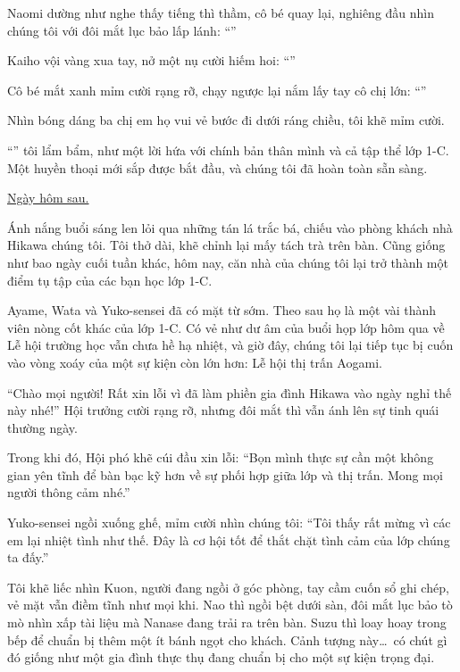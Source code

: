 \documentclass[../main.tex]{subfiles}
\begin{document}
Naomi dường như nghe thấy tiếng thì thầm, cô bé quay lại, nghiêng đầu nhìn chúng tôi với đôi mắt lục bảo lấp lánh: ``''

Kaiho vội vàng xua tay, nở một nụ cười hiếm hoi: ``''

Cô bé mắt xanh mỉm cười rạng rỡ, chạy ngược lại nắm lấy tay cô chị lớn: ``''

Nhìn bóng dáng ba chị em họ vui vẻ bước đi dưới ráng chiều, tôi khẽ mỉm cười.

``'' tôi lẩm bẩm, như một lời hứa với chính bản thân mình và cả tập thể lớp 1-C. Một huyền thoại mới sắp được bắt đầu, và chúng tôi đã hoàn toàn sẵn sàng.

\begin{center}
  \uline{Ngày hôm sau.}
\end{center}

Ánh nắng buổi sáng len lỏi qua những tán lá trắc bá, chiếu vào phòng khách nhà Hikawa chúng tôi. Tôi thở dài, khẽ chỉnh lại mấy tách trà trên bàn. Cũng giống như bao ngày cuối tuần khác, hôm nay, căn nhà của chúng tôi lại trở thành một điểm tụ tập của các bạn học lớp 1-C.

Ayame, Wata và Yuko-sensei đã có mặt từ sớm. Theo sau họ là một vài thành viên nòng cốt khác của lớp 1-C. Có vẻ như dư âm của buổi họp lớp hôm qua về Lễ hội trường học vẫn chưa hề hạ nhiệt, và giờ đây, chúng tôi lại tiếp tục bị cuốn vào vòng xoáy của một sự kiện còn lớn hơn: Lễ hội thị trấn Aogami.

``Chào mọi người! Rất xin lỗi vì đã làm phiền gia đình Hikawa vào ngày nghỉ thế này nhé!'' Hội trưởng cười rạng rỡ, nhưng đôi mắt thì vẫn ánh lên sự tinh quái thường ngày.

Trong khi đó, Hội phó khẽ cúi đầu xin lỗi: ``Bọn mình thực sự cần một không gian yên tĩnh để bàn bạc kỹ hơn về sự phối hợp giữa lớp và thị trấn. Mong mọi người thông cảm nhé.''

Yuko-sensei ngồi xuống ghế, mỉm cười nhìn chúng tôi: ``Tôi thấy rất mừng vì các em lại nhiệt tình như thế. Đây là cơ hội tốt để thắt chặt tình cảm của lớp chúng ta đấy.''

Tôi khẽ liếc nhìn Kuon, người đang ngồi ở góc phòng, tay cầm cuốn sổ ghi chép, vẻ mặt vẫn điềm tĩnh như mọi khi. Nao thì ngồi bệt dưới sàn, đôi mắt lục bảo tò mò nhìn xấp tài liệu mà Nanase đang trải ra trên bàn. Suzu thì loay hoay trong bếp để chuẩn bị thêm một ít bánh ngọt cho khách. Cảnh tượng này\dots\ có chút gì đó giống như một gia đình thực thụ đang chuẩn bị cho một sự kiện trọng đại.
\end{document}
